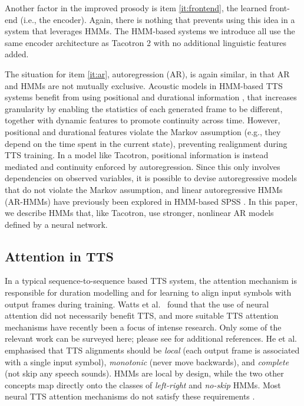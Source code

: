 \documentclass[british]{article}
\begin{document}
Another factor in the improved prosody is item \ref{it:frontend}, the learned front-end (i.e., the encoder).
Again, there is nothing that prevents using this idea in a system that leverages HMMs.
The HMM-based systems we introduce all use the same encoder architecture as Tacotron 2 \cite{shen2018natural} with no additional linguistic features added.

The situation for item \ref{it:ar}, autoregression (AR), is again similar, in that AR and HMMs are not mutually exclusive.
Acoustic models in HMM-based TTS systems benefit from using positional and durational information \cite{wu2016merlin,watts2016hmms}, that increases granularity by enabling the statistics of each generated frame to be different,
together with dynamic features \cite{tokuda2000speech}
to promote continuity across time.
However, positional and durational features violate the Markov assumption (e.g., they depend on the time spent in the current state), preventing realignment during TTS training.
In a model like Tacotron, positional information is instead mediated and continuity enforced by autoregression.
Since this
only involves dependencies on observed variables, it is possible to
devise autoregressive models that do not violate the Markov assumption, and linear autoregressive HMMs (AR-HMMs) \cite{rabiner1989tutorial}
have previously been explored in HMM-based SPSS \cite{shannon2013autoregressive,quillen2012autoregressive,wang2017autoregressive}.
In this paper, we describe HMMs that, like Tacotron, use stronger, nonlinear AR models defined by a neural network.


\subsection{Attention in TTS}
\label{ssec:attention}
In a typical sequence-to-sequence based TTS system, the attention mechanism is responsible for duration modelling and for learning to align input symbols with output frames during training.
Watts et al.\ \cite{watts2019where} found that the use of neural attention did not necessarily benefit TTS,
and more suitable TTS attention mechanisms have recently been a focus of intense research.
Only some of the relevant work can be surveyed here; please see \cite{tan2021survey} for additional references. He et al.\ \cite{he2019robust} emphasised that TTS alignments should be \emph{local} (each output frame is associated with a single input symbol), \emph{monotonic} (never move backwards), and \emph{complete} (not skip any speech sounds).
HMMs are local by design, while the two other concepts map directly onto the classes of \emph{left-right} and \emph{no-skip} HMMs.
Most neural TTS attention mechanisms do not satisfy these requirements \cite{he2019robust,tan2021survey}.
\end{document}
